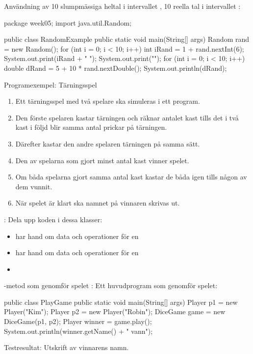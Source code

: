 \documentclass{lecturenotes}
\begin{document}
\begin{Slide}
{Användning av }
10 slumpmässiga heltal i intervallet \code{[1, 6]}, 10 reella tal i intervallet \code{[5.0,~15.0)}:

\begin{Code}
package week05;
import java.util.Random;

public class RandomExample {
    public static void main(String[] args) {
        Random rand = new Random();
        for (int i = 0; i < 10; i++) {
            int iRand = 1 + rand.nextInt(6);
            System.out.print(iRand + " ");
        }
        System.out.print("\n\n");
        for (int i = 0; i < 10; i++) {
            double dRand = 5 + 10 * rand.nextDouble();
            System.out.println(dRand);
        }
    }
}
\end{Code}
\end{Slide} 

\begin{Slide}{Programexempel: Tärningsspel} \footnotesize
{} 
\begin{enumerate} 
\item Ett tärningsspel med två spelare ska simuleras i ett program. 
\item Den förste spelaren kastar tärningen och räknar antalet kast tills det i två kast i följd blir samma antal prickar på tärningen. 
\item Därefter kastar den andre spelaren tärningen på samma sätt. 
\item Den av spelarna som gjort minst antal kast vinner spelet. 
\item Om båda spelarna gjort samma antal kast kastar de båda igen tills någon av dem vunnit. 
\item När spelet är klart ska namnet på vinnaren skrivas ut.

\end{enumerate}

:  Dela upp koden i dessa klasser: 
\begin{itemize}
\item {} har hand om data och operationer för en 
\item {} har hand om data och operationer för en 
\item {} 
\end{itemize}
\end{Slide} 

\begin{Slide}
{-metod som genomför spelet}
: Ett huvudprogram som genomför spelet:
\begin{Code}
public class PlayGame {
    public static void main(String[] args) {
        Player p1 = new Player("Kim");
        Player p2 = new Player("Robin");
        DiceGame game = new DiceGame(p1, p2);
        Player winner = game.play();
        System.out.println(winner.getName() +  " vann");
    }
}
\end{Code}
Testresultat: Utskrift av vinnarens namn.
\end{Slide} 
\end{document}
